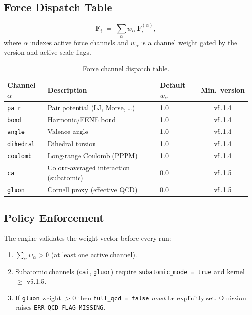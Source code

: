\documentclass[11pt,a4paper]{article}
\newcommand{\Fvec}{\mathbf{F}}
\begin{document}
\subsection{Force Dispatch Table}

\[
  \Fvec_i \;=\; \sum_{\alpha} w_\alpha \, \Fvec_i^{(\alpha)} ,
\]
where $\alpha$ indexes active force channels and $w_\alpha$ is a channel
weight gated by the version and active-scale flags.

\begin{table}[H]
\centering
\caption{Force channel dispatch table.}
\label{tab:dispatch}
\begin{tabular}{@{}lllc@{}}
\toprule
Channel $\alpha$ & Description & Default $w_\alpha$ & Min.\ version \\
\midrule
\texttt{pair}    & Pair potential (LJ, Morse, \ldots) & 1.0 & v5.1.4 \\
\texttt{bond}    & Harmonic/FENE bond & 1.0 & v5.1.4 \\
\texttt{angle}   & Valence angle & 1.0 & v5.1.4 \\
\texttt{dihedral}& Dihedral torsion & 1.0 & v5.1.4 \\
\texttt{coulomb} & Long-range Coulomb (PPPM) & 1.0 & v5.1.4 \\
\texttt{cai}     & Colour-averaged interaction (subatomic) & 0.0 & v5.1.5 \\
\texttt{gluon}   & Cornell proxy (effective QCD) & 0.0 & v5.1.5 \\
\bottomrule
\end{tabular}
\end{table}

\subsection{Policy Enforcement}

The engine validates the weight vector before every run:
\begin{enumerate}[leftmargin=1.5em]
  \item $\sum_\alpha w_\alpha > 0$ (at least one active channel).
  \item Subatomic channels (\texttt{cai}, \texttt{gluon}) require
    \texttt{subatomic\_mode = true} and kernel $\geq$ v5.1.5.
  \item If \texttt{gluon} weight $> 0$ then \texttt{full\_qcd = false}
    \emph{must} be explicitly set.  Omission raises
    \texttt{ERR\_QCD\_FLAG\_MISSING}.
\end{enumerate}
\end{document}
